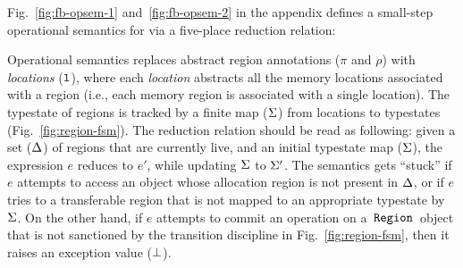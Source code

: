 Fig.~\ref{fig:fb-opsem-1} and~\ref{fig:fb-opsem-2} in the appendix
defines a small-step operational semantics for \fbname via a
five-place reduction relation:
\begin{smathpar}
\end{smathpar}
Operational semantics replaces abstract region annotations ($\pi$ and
$\rho$) with \emph{locations} ($\mathtt{l}$), where each \emph{location}
abstracts all the memory locations associated with a region (i.e.,
each memory region is associated with a single location). The
typestate of regions is tracked by a finite map ($\Sigma$) from
locations to typestates (Fig.~\ref{fig:region-fsm}). The reduction
relation should be read as following: given a set ($\Delta$) of
regions that are currently live, and an initial typestate map
($\Sigma$), the expression $e$ reduces to $e'$, while updating $\Sigma$ to
$\Sigma'$. The semantics gets ``stuck'' if $e$ attempts to access an
object whose allocation region is not present in $\Delta$, or if $e$
tries to  a transferable region that is not mapped to an
appropriate typestate by $\Sigma$.  On the other hand, if $e$ attempts
to commit an operation on a $\,{\tt Region}\,$ object that is not sanctioned by
the transition discipline in Fig.~\ref{fig:region-fsm}, then it raises
an exception value ($\bot$).

